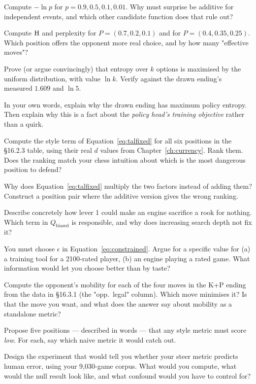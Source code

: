 \begin{exercises}

 Compute $-\ln p$ for $p = 0.9, 0.5, 0.1, 0.01$. Why must
surprise be additive for independent events, and which other candidate function does that rule
out?

 Compute $\operatorname{H}$ and perplexity for $P = (0.7,0.2,0.1)$
and for $P = (0.4,0.35,0.25)$. Which position offers the opponent more real choice, and by how
many "effective moves"?

 Prove (or argue convincingly) that entropy over $k$
options is maximised by the uniform distribution, with value $\ln k$. Verify against the
drawn ending's measured $1.609$ and $\ln 5$.

 In your own words, explain why the drawn ending has maximum
policy entropy. Then explain why this is a fact about the \emph{policy head's training
objective} rather than a quirk.

 Compute the style term of
Equation~\eqref{eq:talfixed} for all six positions in the §16.2.3 table, using their real $d$
values from Chapter~\ref{ch:currency}. Rank them. Does the ranking match your chess intuition
about which is the most dangerous position to defend?

 Why does
Equation~\eqref{eq:talfixed} multiply the two factors instead of adding them? Construct a
position pair where the additive version gives the wrong ranking.

 Describe concretely how lever 1 could make an engine
sacrifice a rook for nothing. Which term in $Q_{\text{biased}}$ is responsible, and why does
increasing search depth not fix it?

 You must choose $\epsilon$ in
Equation~\eqref{eq:constrained}. Argue for a specific value for (a) a training tool for a
2100-rated player, (b) an engine playing a rated game. What information would let you choose
better than by taste?

 Compute the opponent's mobility for each of the four moves in
the K+P ending from the data in §16.3.1 (the "opp.\ legal" column). Which move minimises it?
Is that the move you want, and what does the answer say about mobility as a standalone
metric?

 Propose five positions --- described in words ---
that any style metric must score \emph{low}. For each, say which naive metric it would catch
out.

 Design the experiment that would tell you whether your
steer metric predicts human error, using your 9{,}030-game corpus. What would you compute,
what would the null result look like, and what confound would you have to control for?

\end{exercises}
